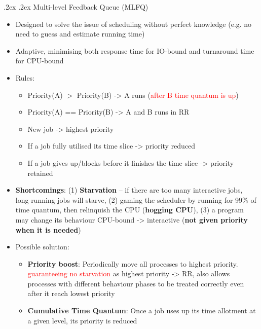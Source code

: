 \documentclass[13pt,landscape,a4paper]{article}
\makeatletter
\renewcommand{\subsubsection}{\@startsection{subsubsection}{1}{0mm}%
    {.2ex}%
    {.2ex}%
    {\rmfamily\bfseries}}
\makeatother
\begin{document}
\begin{multicols*}{3}
        \subsubsection{Multi-level Feedback Queue (MLFQ)}
        \begin{itemize}
            \item Designed to solve the issue of scheduling without perfect knowledge (e.g. no need to guess and estimate running time)
            \item Adaptive, minimising both response time for IO-bound and turnaround time for CPU-bound
            \item Rules:
            \begin{itemize}
                \item Priority(A) $>$ Priority(B) -> A runs (\textcolor{red}{after B time quantum is up})
                \item Priority(A) == Priority(B) -> A and B runs in RR
                \item New job -> highest priority
                \item If a job fully utilised its time slice -> priority reduced
                \item If a job gives up/blocks before it finishes the time slice -> priority retained
            \end{itemize}
            \item \textbf{Shortcomings}: (1) \textbf{Starvation} -- if there are too many interactive jobs, long-running jobs will starve, (2) gaming the scheduler by running for 99\% of time quantum, then relinquish the CPU (\textbf{hogging CPU}), (3) a program may change its behaviour CPU-bound -> interactive (\textbf{not given priority when it is needed})
            \item Possible solution:
            \begin{itemize}
                \item \textbf{Priority boost}: Periodically move all processes to highest priority. \textcolor{red}{guaranteeing no starvation }as highest priority -> RR, also allows processes with different behaviour phases to be treated correctly even after it reach lowest priority
                \item \textbf{Cumulative Time Quantum}: Once a job uses up its time allotment at a given level, its priority is reduced
            \end{itemize}
        \end{itemize}

\end{multicols*}
\end{document}
